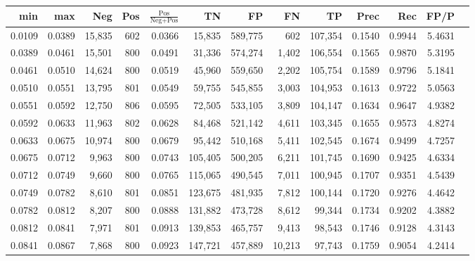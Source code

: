 \begin{tabular}{rrrrrrrrrrrrr}
\toprule
   min &    max &    Neg & Pos & $\frac{\text{Pos}}{\text{Neg}+\text{Pos}}$ &      TN &      FP &      FN &      TP &   Prec &    Rec &   FP/P \\
\midrule
0.0109 & 0.0389 & 15,835 & 602 &                                     0.0366 &  15,835 & 589,775 &     602 & 107,354 & 0.1540 & 0.9944 & 5.4631 \\
0.0389 & 0.0461 & 15,501 & 800 &                                     0.0491 &  31,336 & 574,274 &   1,402 & 106,554 & 0.1565 & 0.9870 & 5.3195 \\
0.0461 & 0.0510 & 14,624 & 800 &                                     0.0519 &  45,960 & 559,650 &   2,202 & 105,754 & 0.1589 & 0.9796 & 5.1841 \\
0.0510 & 0.0551 & 13,795 & 801 &                                     0.0549 &  59,755 & 545,855 &   3,003 & 104,953 & 0.1613 & 0.9722 & 5.0563 \\
0.0551 & 0.0592 & 12,750 & 806 &                                     0.0595 &  72,505 & 533,105 &   3,809 & 104,147 & 0.1634 & 0.9647 & 4.9382 \\
0.0592 & 0.0633 & 11,963 & 802 &                                     0.0628 &  84,468 & 521,142 &   4,611 & 103,345 & 0.1655 & 0.9573 & 4.8274 \\
0.0633 & 0.0675 & 10,974 & 800 &                                     0.0679 &  95,442 & 510,168 &   5,411 & 102,545 & 0.1674 & 0.9499 & 4.7257 \\
0.0675 & 0.0712 &  9,963 & 800 &                                     0.0743 & 105,405 & 500,205 &   6,211 & 101,745 & 0.1690 & 0.9425 & 4.6334 \\
0.0712 & 0.0749 &  9,660 & 800 &                                     0.0765 & 115,065 & 490,545 &   7,011 & 100,945 & 0.1707 & 0.9351 & 4.5439 \\
0.0749 & 0.0782 &  8,610 & 801 &                                     0.0851 & 123,675 & 481,935 &   7,812 & 100,144 & 0.1720 & 0.9276 & 4.4642 \\
0.0782 & 0.0812 &  8,207 & 800 &                                     0.0888 & 131,882 & 473,728 &   8,612 &  99,344 & 0.1734 & 0.9202 & 4.3882 \\
0.0812 & 0.0841 &  7,971 & 801 &                                     0.0913 & 139,853 & 465,757 &   9,413 &  98,543 & 0.1746 & 0.9128 & 4.3143 \\
0.0841 & 0.0867 &  7,868 & 800 &                                     0.0923 & 147,721 & 457,889 &  10,213 &  97,743 & 0.1759 & 0.9054 & 4.2414 \\

\end{tabular}
